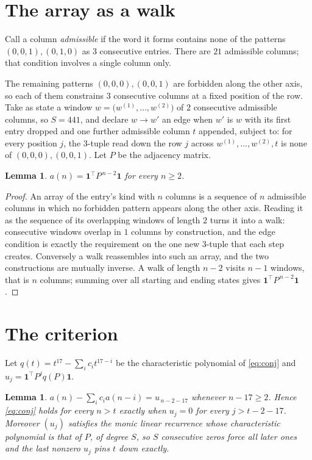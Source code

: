 \documentclass[11pt,a4paper]{article}
\theoremstyle{plain}
\newtheorem{lemma}[theorem]{Lemma}
\theoremstyle{definition}
\begin{document}
\section{The array as a walk}

Call a column \emph{admissible} if the word it forms contains none of the patterns
$(0,0,1), (0,1,0)$ as $3$ consecutive entries. There are $21$ admissible columns; that condition
involves a single column only.

The remaining patterns $(0,0,0), (0,0,1)$ are forbidden along the other axis, so each of them
constrains $3$ consecutive columns at a fixed position of the row. Take as state a
window $w=\bigl(w^{(1)},\dots,w^{(2)}\bigr)$ of $2$ consecutive admissible
columns, so $S=441$, and declare $w\to w'$ an edge when $w'$ is $w$ with its first entry
dropped and one further admissible column $t$ appended, subject to: for every position
$j$, the $3$-tuple read down the row $j$ across $w^{(1)},\dots,w^{(2)},t$
is none of $(0,0,0), (0,0,1)$. Let $P$ be the adjacency matrix.

\begin{lemma}\label{lem:walk}
$a(n)=\mathbf{1}^{\!\top}P^{\,n-2}\mathbf{1}$ for every $n\ge2$.
\end{lemma}

\begin{proof}
An array of the entry's kind with $n$ columns is a sequence of $n$ admissible columns in
which no forbidden pattern appears along the other axis. Reading it as the sequence of its
overlapping windows of length $2$ turns it into a walk: consecutive windows overlap in
$1$ columns by construction, and the edge condition is exactly the requirement on the one
new $3$-tuple that each step creates. Conversely a walk reassembles into such an array,
and the two constructions are mutually inverse. A walk of length $n-2$ visits $n-1$
windows, that is $n$ columns; summing over all starting and ending states gives
$\mathbf{1}^{\!\top}P^{\,n-2}\mathbf{1}$.
\end{proof}

\section{The criterion}

Let $q(t)=t^{17}-\sum_i c_i t^{17-i}$ be the characteristic polynomial of
\eqref{eq:conj} and $u_j=\mathbf{1}^{\!\top}P^{j}q(P)\mathbf{1}$.

\begin{lemma}\label{lem:crit}
$a(n)-\sum_i c_i a(n-i)=u_{\,n-2-17}$ whenever $n-17\ge2$. Hence
\eqref{eq:conj} holds for every $n>t$ exactly when $u_j=0$ for every
$j>t-2-17$. Moreover $(u_j)$ satisfies the monic linear recurrence whose
characteristic polynomial is that of $P$, of degree $S$, so $S$ consecutive zeros force all
later ones and the last nonzero $u_j$ pins $t$ down exactly.
\end{lemma}
\end{document}

